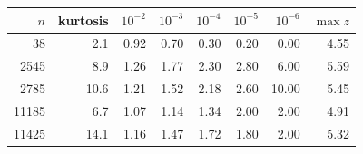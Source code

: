 \begin{tabular}{rrrrrrrr}
\toprule
$n$ & kurtosis & $10^{-2}$ & $10^{-3}$ & $10^{-4}$ & $10^{-5}$ & $10^{-6}$ & $\max z$ \\
\midrule
38 & 2.1 & 0.92 & 0.70 & 0.30 & 0.20 & 0.00 & 4.55 \\
2545 & 8.9 & 1.26 & 1.77 & 2.30 & 2.80 & 6.00 & 5.59 \\
2785 & 10.6 & 1.21 & 1.52 & 2.18 & 2.60 & 10.00 & 5.45 \\
11185 & 6.7 & 1.07 & 1.14 & 1.34 & 2.00 & 2.00 & 4.91 \\
11425 & 14.1 & 1.16 & 1.47 & 1.72 & 1.80 & 2.00 & 5.32 \\
\bottomrule
\end{tabular}